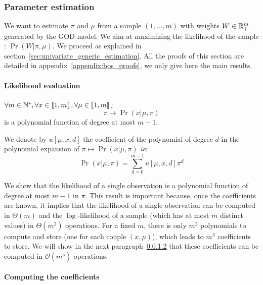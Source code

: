 \subsubsection{Parameter estimation}

We want to estimate $\pi$ and $\mu$ from a sample $(1, \dots, m)$ with weights $W \in \mathbb{R}_{+}^m$ generated by the GOD model. We aim at maximizing the likelihood of the sample : $\Pr(W | \pi, \mu)$. We proceed as explained in section~\ref{sec:univariate_generic_estimation}. All the proofs of this section are detailed in appendix~\ref{appendix:bos_proofs}, we only give here the main results.

\paragraph{Likelihood evaluation}

\begin{thm}
    $\forall m \in \mathbb{N}^*, \forall x \in \left\llbracket1, m\right\rrbracket, \forall \mu \in \left\llbracket1, m\right\rrbracket$,:
    \[ \pi \mapsto \Pr(x | \mu, \pi) \]
    is a polynomial function of degree at most $m - 1$.  
\end{thm}

\begin{definition}
    We denote by $u[\mu, x, d]$ the coefficient of the polynomial of degree $d$ in the polynomial expansion of $\pi \mapsto \Pr(x | \mu, \pi)$ \textit{ie}:
    \[ \Pr(x | \mu, \pi) = \sum_{d = 0}^{m - 1} u[\mu, x, d] \pi^d \]
\end{definition}

We show that the likelihood of a single observation is a polynomial function of degree at most $m - 1$ in $\pi$. This result is important because, once the coefficients are known, it implies that the likelihood of a single observation can be computed in $\Theta(m)$ and the $\log$-likelihood of a sample (which has at most $m$ distinct values) in $\Theta(m^2)$ operations. 
For a fixed $m$, there is only $m^2$ polynomials to compute and store (one for each couple $(x, \mu)$), which leads to $m^3$ coefficients to store. We will show in the next paragraph~\ref{sec:bos_coefficients} that these coefficients can be computed in $\mathcal O(m^5)$ operations.

\paragraph{Computing the coefficients}
\label{sec:bos_coefficients}

